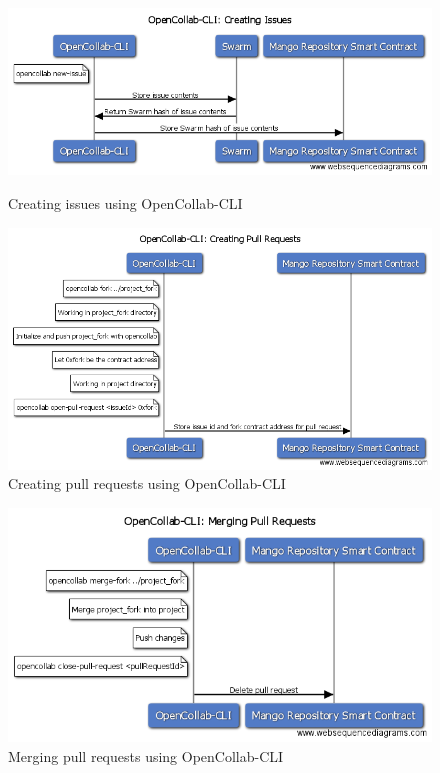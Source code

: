 \begin{figure}[p!]
  \centering
  \includegraphics[width=\linewidth,keepaspectratio]{figures/OpenCollab-CLI-Creating-Issues.png}
  \caption{Creating issues using OpenCollab-CLI}

  \vspace*{\floatsep}

  \includegraphics[width=\linewidth,keepaspectratio]{figures/OpenCollab-CLI-Creating-Pull-Requests.png}
  \caption{Creating pull requests using OpenCollab-CLI}
\end{figure}

\begin{figure}[p!]
  \centering

  \includegraphics[width=\linewidth,keepaspectratio]{figures/OpenCollab-CLI-Merging-Pull-Requests.png}
  \caption{Merging pull requests using OpenCollab-CLI}
\end{figure}

